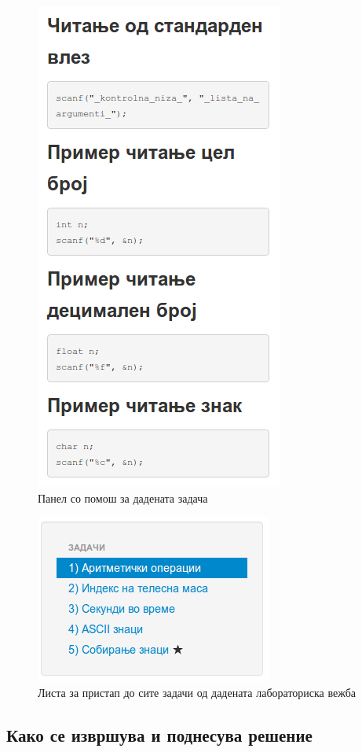 \begin{figure}[htbp]
\centering
\includegraphics[scale=.5]{images/elab/help}
\caption{Панел со помош за дадената задача}
\label{fig:help}
\end{figure}

\begin{figure}[htbp]
\centering
\includegraphics[scale=.5]{images/elab/problems}
\caption{Листа за пристап до сите задачи од дадената лабораториска вежба}
\label{fig:problems}
\end{figure}

\subsection{Како се извршува и поднесува решение}

